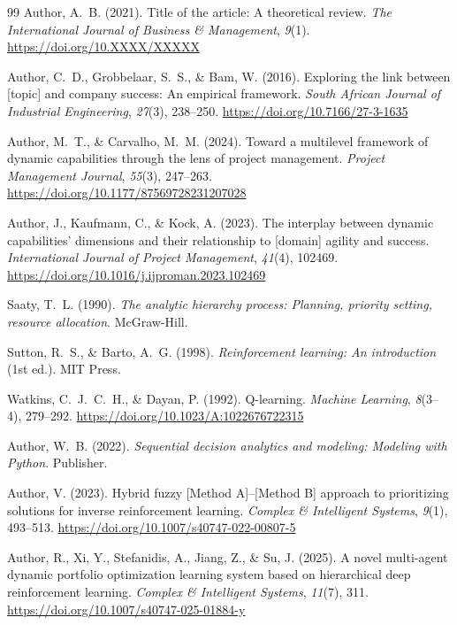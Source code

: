 \documentclass[10pt,twocolumn]{article}
\begin{document}
\begin{thebibliography}{99}
\setlength{\itemsep}{2pt}
\setlength{\parskip}{0pt}
Author, A.\ B. (2021).
Title of the article: A theoretical review.
\textit{The International Journal of Business \& Management},
\textit{9}(1). \url{https://doi.org/10.XXXX/XXXXX}

Author, C.\ D., Grobbelaar, S.\ S., \& Bam, W. (2016).
Exploring the link between [topic] and company success:
An empirical framework.
\textit{South African Journal of Industrial Engineering},
\textit{27}(3), 238--250.
\url{https://doi.org/10.7166/27-3-1635}

Author, M.\ T., \& Carvalho, M.\ M. (2024).
Toward a multilevel framework of dynamic capabilities through
the lens of project management.
\textit{Project Management Journal}, \textit{55}(3), 247--263.
\url{https://doi.org/10.1177/87569728231207028}

Author, J., Kaufmann, C., \& Kock, A. (2023).
The interplay between dynamic capabilities' dimensions and
their relationship to [domain] agility and success.
\textit{International Journal of Project Management},
\textit{41}(4), 102469.
\url{https://doi.org/10.1016/j.ijproman.2023.102469}

Saaty, T.\ L. (1990).
\textit{The analytic hierarchy process: Planning, priority
setting, resource allocation}.
McGraw-Hill.

Sutton, R.\ S., \& Barto, A.\ G. (1998).
\textit{Reinforcement learning: An introduction} (1st ed.).
MIT Press.

Watkins, C.\ J.\ C.\ H., \& Dayan, P. (1992).
Q-learning.
\textit{Machine Learning}, \textit{8}(3--4), 279--292.
\url{https://doi.org/10.1023/A:1022676722315}

Author, W.\ B. (2022).
\textit{Sequential decision analytics and modeling: Modeling
with Python}.
Publisher.

Author, V. (2023).
Hybrid fuzzy [Method A]--[Method B] approach to prioritizing
solutions for inverse reinforcement learning.
\textit{Complex \& Intelligent Systems}, \textit{9}(1), 493--513.
\url{https://doi.org/10.1007/s40747-022-00807-5}

Author, R., Xi, Y., Stefanidis, A., Jiang, Z., \& Su, J. (2025).
A novel multi-agent dynamic portfolio optimization learning
system based on hierarchical deep reinforcement learning.
\textit{Complex \& Intelligent Systems}, \textit{11}(7), 311.
\url{https://doi.org/10.1007/s40747-025-01884-y}
\end{thebibliography}
\end{document}
